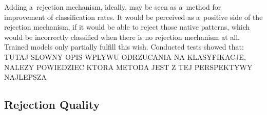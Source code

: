 \documentclass{llncs}
\begin{document}
{\color{blue}
Adding a~rejection mechanism, ideally, may be seen as a~method for improvement of classification rates. It would be perceived as a~positive side of the rejection mechanism, if it would be able to reject those native patterns, which would be incorrectly classified when there is no rejection mechanism at all. Trained models only partially fulfill this wish. Conducted tests showed that: TUTAJ SLOWNY OPIS WPLYWU ODRZUCANIA NA KLASYFIKACJE, NALEZY POWIEDZIEC KTORA METODA JEST Z TEJ PERSPEKTYWY NAJLEPSZA}


\subsection{Rejection Quality}
\end{document}
